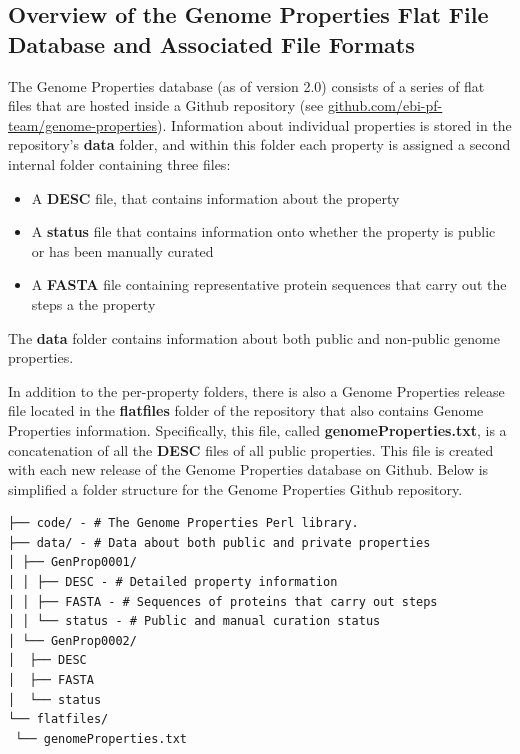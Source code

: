\subsection{Overview of the Genome Properties Flat File Database and Associated File Formats} \label{Genome-Properties-Files} 

The Genome Properties database (as of version 2.0) consists of a series of flat files that are hosted inside a Github repository (see \href{github.com/ebi-pf-team/genome-properties}{github.com/ebi-pf-team/genome-properties}). Information about individual properties is stored in the repository's \textbf{data} folder, and within this folder each property is assigned a second internal folder containing three files: 

\begin{itemize}
\item A \textbf{DESC} file, that contains information about the property
\item A \textbf{status} file that contains information onto whether the property is public or has been manually curated
\item A \textbf{FASTA} \cite{pearson19905} file containing representative protein sequences that carry out the steps a the property
\end{itemize}

The \textbf{data} folder contains information about both public and non-public genome properties. 

In addition to the per-property folders, there is also a Genome Properties release file located in the \textbf{flatfiles} folder of the repository that also contains Genome Properties information. Specifically, this file, called \textbf{genomeProperties.txt}, is a concatenation of all the \textbf{DESC} files of all public properties. This file is created with each new release of the Genome Properties database on Github. Below is simplified a folder structure for the Genome Properties Github repository.

\begin{verbatim}
├── code/ - # The Genome Properties Perl library.
├── data/ - # Data about both public and private properties
│ ├── GenProp0001/
│ │ ├── DESC - # Detailed property information
│ │ ├── FASTA - # Sequences of proteins that carry out steps
│ │ └── status - # Public and manual curation status
│ └── GenProp0002/
│  ├── DESC
│  ├── FASTA
│  └── status
└── flatfiles/
 └── genomeProperties.txt
\end{verbatim}


